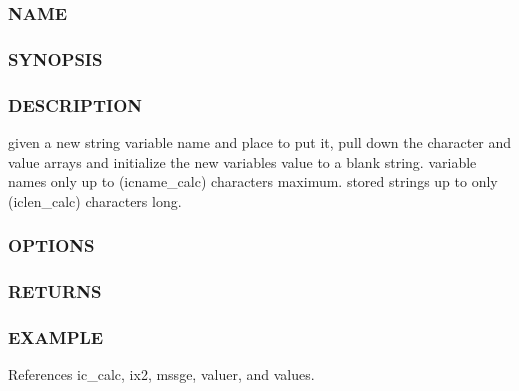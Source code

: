 \subsubsection*{N\+A\+ME}

\subsubsection*{S\+Y\+N\+O\+P\+S\+IS}

\subsubsection*{D\+E\+S\+C\+R\+I\+P\+T\+I\+ON}

given a new string variable name and place to put it, pull down the character and value arrays and initialize the new variable\textquotesingle{}s value to a blank string. variable names only up to (icname\+\_\+calc) characters maximum. stored strings up to only (iclen\+\_\+calc) characters long. \subsubsection*{O\+P\+T\+I\+O\+NS}

\subsubsection*{R\+E\+T\+U\+R\+NS}

\subsubsection*{E\+X\+A\+M\+P\+LE}

References ic\+\_\+calc, ix2, mssge, valuer, and values.

\mbox{\label{namespacem__calculator_a6fc04e994f45d649d5e412e0013bf127}} 

